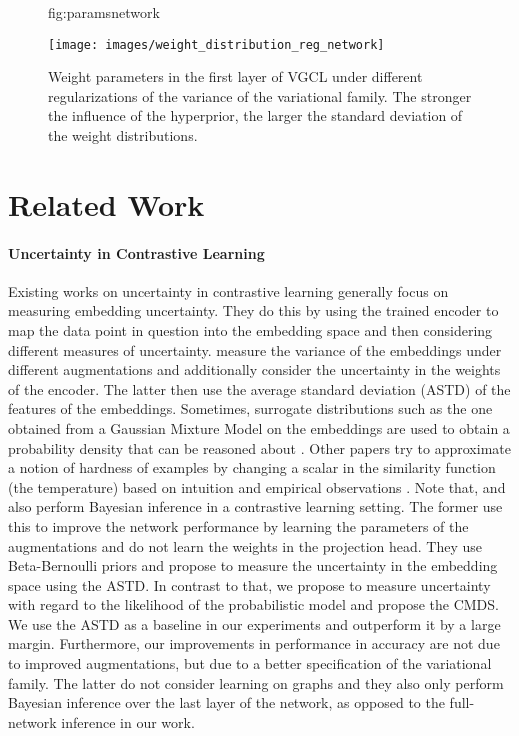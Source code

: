 \documentclass[tablecaption=bottom,wcp]{jmlr} %
\begin{document}
\begin{figure}[!h]
\floatconts
  {fig:paramsnetwork}
  {\caption{Weight parameters in the first layer of VGCL under different regularizations of the variance of the variational family. The stronger the influence of the hyperprior, the larger the standard deviation of the weight distributions.  }}
  {\texttt{[image: images/weight\_distribution\_reg\_network]}}
\end{figure}






\newpage
\section{Related Work}
\label{sec:related_work}

\paragraph{Uncertainty in Contrastive Learning}

Existing works on uncertainty in contrastive learning generally focus on measuring embedding uncertainty. They do this by using the trained encoder to map the data point in question into the embedding space and then considering different measures of uncertainty. \citet{ardeshir2022uncertainty} measure the variance of the embeddings under different augmentations and \citet{BGCL} additionally consider the uncertainty in the weights of the encoder. The latter then use the average standard deviation (ASTD) of the features of the embeddings. Sometimes, surrogate distributions such as the one obtained from a Gaussian Mixture Model on the embeddings are used to obtain a probability density that can be reasoned about \citep{ardeshir2022uncertainty,wu2020simple}. Other papers try to approximate a notion of hardness of examples by changing a scalar in the similarity function (the temperature) based on intuition and empirical observations \citep{zhang2021temperature}. Note that, \citet{BGCL} and \citet{sharma2023incorporating} also perform Bayesian inference in a contrastive learning setting. The former use this to improve the network performance by learning the parameters of the augmentations and do not learn the weights in the projection head. They use Beta-Bernoulli priors and propose to measure the uncertainty in the embedding space using the ASTD. In contrast to that, we propose to measure uncertainty with regard to the likelihood of the probabilistic model and propose the CMDS. We use the ASTD as a baseline in our experiments and outperform it by a large margin. Furthermore, our improvements in performance in accuracy are not due to improved augmentations, but due to a better specification of the variational family. The latter do not consider learning on graphs and they also only perform Bayesian inference over the last layer of the network, as opposed to the full-network inference in our work.
\end{document}
